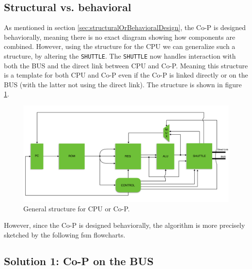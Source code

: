 
\subsection{Structural vs. behavioral} \label{sec:structuralOrBehavioralImplementation}

As mentioned in section \ref{sec:structuralOrBehavioralDesign}, the Co-P is designed behaviorally, meaning there is no exact diagram showing how components are combined. However, using the structure for the CPU we can generalize such a structure, by altering the \texttt{SHUTTLE}. The \texttt{SHUTTLE} now handles interaction with both the BUS and the direct link between CPU and Co-P. Meaning this structure is a template for both CPU and Co-P even if the Co-P is linked directly or on the BUS (with the latter not using the direct link). The structure is shown in figure \ref{fig:GeneralStructure}.

\begin{figure}[H]
    \centering
    \includegraphics[width = \textwidth]{2Implementation/fig/ComputerArchitecture_A3}
    \caption{General structure for CPU or Co-P.}
    \label{fig:GeneralStructure}
\end{figure}

However, since the Co-P is designed behaviorally, the algorithm is more precisely sketched by the following fsm flowcharts.

\subsection{Solution 1: Co-P on the BUS}\label{sec:implementation1}

